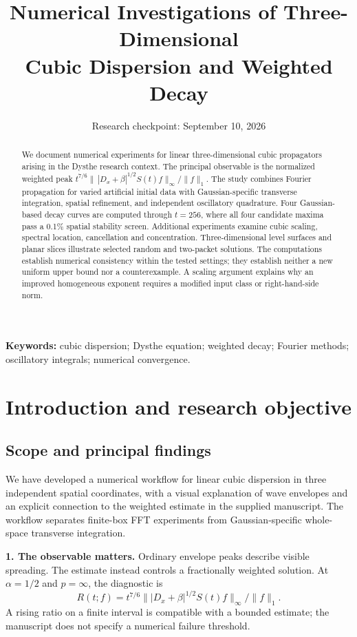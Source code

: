 \documentclass[10pt,letterpaper]{article}
\title{Numerical Investigations of Three-Dimensional\\Cubic Dispersion and Weighted Decay}
\author{}
\date{Research checkpoint: September 10, 2026}
\numberwithin{equation}{section}
\begin{document}
\maketitle
\begin{abstract}
We document numerical experiments for linear three-dimensional cubic propagators
arising in the Dysthe research context. The principal observable is the normalized
weighted peak $t^{7/6}\|\,|D_x+\beta|^{1/2}S(t)f\|_\infty/\|f\|_1$.
The study combines Fourier propagation for varied artificial initial data with
Gaussian-specific transverse integration, spatial refinement, and independent
oscillatory quadrature. Four Gaussian-based decay curves are computed through
$t=256$, where all four candidate maxima pass a 0.1\% spatial stability screen.
Additional experiments examine cubic scaling, spectral location, cancellation
and concentration. Three-dimensional level surfaces and planar slices illustrate
selected random and two-packet solutions. The computations establish numerical
consistency within the tested settings; they establish neither a new uniform
upper bound nor a counterexample. A scaling argument explains why an improved
homogeneous exponent requires a modified input class or right-hand-side norm.
\end{abstract}
\noindent\textbf{Keywords:} cubic dispersion; Dysthe equation; weighted decay;
Fourier methods; oscillatory integrals; numerical convergence.
\tableofcontents
\clearpage

\section{Introduction and research objective}

\subsection{Scope and principal findings}\label{summary}
We have developed a numerical workflow for linear cubic dispersion in three
independent spatial coordinates, with a visual explanation of wave envelopes and
an explicit connection to the weighted estimate in the supplied manuscript.
The workflow separates finite-box FFT experiments from Gaussian-specific
whole-space transverse integration.

\textbf{1. The observable matters.} Ordinary envelope peaks describe visible
spreading. The estimate instead controls a fractionally weighted solution. At
$\alpha=1/2$ and $p=\infty$, the diagnostic is
\begin{equation}
 R(t;f)=t^{7/6}\big\||D_x+\beta|^{1/2}S(t)f\big\|_\infty/\|f\|_1.
\end{equation}
A rising ratio on a finite interval is compatible with a bounded estimate; the
manuscript does not specify a numerical failure threshold.
\end{document}

